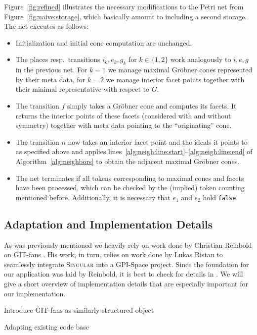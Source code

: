 \documentclass[
  paper=a4,
  titlepage,
  bibliography=totoc,
  pagesize=pdftex
]{scrartcl}
\numberwithin{figure}{section}
\numberwithin{equation}{section}
\numberwithin{table}{section}
\theoremstyle{definition}
\numberwithin{definition}{section}
\begin{document}
Figure~\ref{fig:refined} illustrates the necessary modifications to the Petri net from
Figure~\ref{fig:naive:storage}, which basically amount to including a second storage. The
net executes as follows:
\begin{itemize}
  \item Initialization and initial cone computation are unchanged.
  \item The places resp.\ transitions $i_k, e_k, g_k$ for $k \in \{1, 2\}$ work
    analogously to $i,e,g$ in the previous net. For $k=1$ we manage maximal Gröbner cones
    represented by their meta data, for $k=2$ we manage interior facet points together
    with their minimal representative with respect to $G$.
  \item The transition $f$ simply takes a Gröbner cone and computes its facets. It returns
    the interior points of these facets (considered with and without symmetry) together
    with meta data pointing to the \enquote{originating} cone.
  \item The transition $n$ now takes an interior facet point and the ideals it points to
    as specified above and applies
    lines~\ref{alg:neigh:line:start}--\ref{alg:neigh:line:end} of
    Algorithm~\ref{alg:neighbors} to obtain the adjacent maximal Gröbner cones.
  \item The net terminates if all tokens corresponding to maximal cones and facets have
    been processed, which can be checked by the (implied) token counting mentioned before.
    Additionally, it is necessary that $e_1$ and $e_2$ hold \texttt{false}.
\end{itemize}

\subsection{Adaptation and Implementation Details}

As was previously mentioned we heavily rely on work done by Christian Reinbold on GIT-fans
\cite{reinboldGitFan}. His work, in turn, relies on work done by Lukas Ristau to
seamlessly integrate \textsc{Singular} into a GPI-Space project. Since the foundation for
our application was laid by Reinbold, it is best to check for details in
\cite[Section~4]{reinboldGitFan}. We will give a short overview of implementation details
that are especially important for our implementation.

Introduce GIT-fans as similarly structured object

Adapting existing code base
\end{document}
